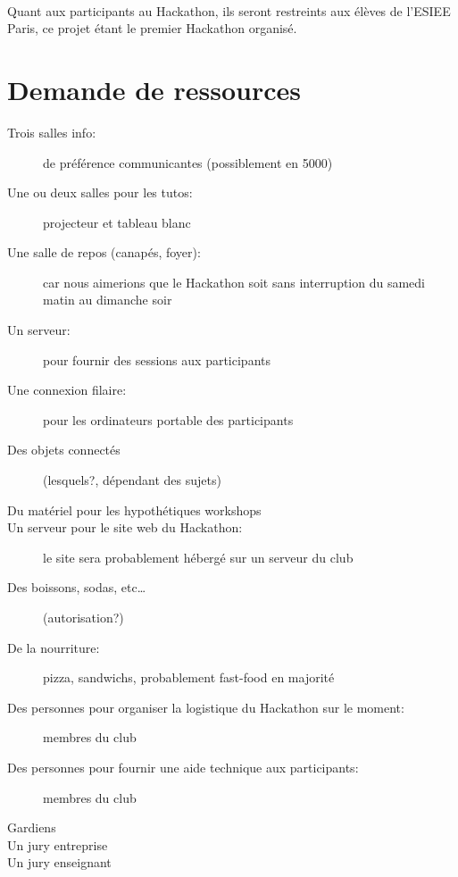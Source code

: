 \documentclass{article}
\begin{document}
\paragraph{}
Quant aux participants au Hackathon, ils seront restreints aux élèves de
l'ESIEE Paris, ce projet étant le premier Hackathon organisé.


\section{Demande de ressources}
\begin{description}
	\item[Trois salles info:] de préférence communicantes (possiblement en 5000)
	\item[Une ou deux salles pour les tutos:] projecteur et tableau blanc
	\item[Une salle de repos (canapés, foyer):] car nous aimerions que le Hackathon soit sans interruption du samedi matin au dimanche soir
	\item[Un serveur:] pour fournir des sessions aux participants
	\item[Une connexion filaire:] pour les ordinateurs portable des participants
	\item[Des objets connectés] (lesquels?, dépendant des sujets)
	\item[Du matériel pour les hypothétiques workshops]
	\item[Un serveur pour le site web du Hackathon:] le site sera probablement hébergé sur un serveur du club
	\item[Des boissons, sodas, etc…] (autorisation?)
	\item[De la nourriture:] pizza, sandwichs, probablement fast-food en majorité
	\item[Des personnes pour organiser la logistique du Hackathon sur le moment:] membres du club
	\item[Des personnes pour fournir une aide technique aux participants:] membres du club
	\item[Gardiens]
	\item[Un jury entreprise]
	\item[Un jury enseignant]
\end{description}
\end{document}
